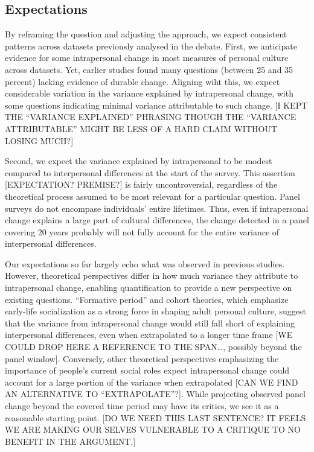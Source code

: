\documentclass[
  11pt,
]{article}
\begin{document}
\hypertarget{expectations}{%
\subsection{Expectations}\label{expectations}}

By reframing the question and adjusting the approach, we expect
consistent patterns across datasets previously analysed in the debate.
First, we anticipate evidence for some intrapersonal change in most
measures of personal culture across datasets. Yet, earlier studies found
many questions (between 25 and 35 percent) lacking evidence of durable
change. Aligning wiht this, we expect considerable variation in the
variance explained by intrapersonal change, with some questions
indicating minimal variance attributable to such change. {[}I KEPT THE
``VARIANCE EXPLAINED'' PHRASING THOUGH THE ``VARIANCE ATTRIBUTABLE''
MIGHT BE LESS OF A HARD CLAIM WITHOUT LOSING MUCH?{]}

Second, we expect the variance explained by intrapersonal to be modest
compared to interpersonal differences at the start of the survey. This
assertion {[}EXPECTATION? PREMISE?{]} is fairly uncontroversial,
regardless of the theoretical process assumed to be most relevant for a
particular question. Panel surveys do not encompase individuals' entire
lifetimes. Thus, even if intrapersonal change explains a large part of
cultural differences, the change detected in a panel covering 20 years
probably will not fully account for the entire variance of interpersonal
differences.

Our expectations so far largely echo what was observed in previous
studies. However, theoretical perspectives differ in how much variance
they attribute to intrapersonal change, enabling quantification to
provide a new perspective on existing questions. ``Formative period''
and cohort theories, which emphasize early-life socialization as a
strong force in shaping adult personal culture, suggest that the
variance from intrapersonal change would still fall short of explaining
interpersonal differences, even when extrapolated to a longer time frame
{[}WE COULD DROP HERE A REFERENCE TO THE SPAN\ldots, possibly beyond the
panel window{]}. Conversely, other theoretical perspectives emphasizing
the importance of people's current social roles expect intrapersonal
change could account for a large portion of the variance when
extrapolated {[}CAN WE FIND AN ALTERNATIVE TO ``EXTRAPOLATE''?{]}. While
projecting observed panel change beyond the covered time period may have
its critics, we see it as a reasonable starting point. {[}DO WE NEED
THIS LAST SENTENCE? IT FEELS WE ARE MAKING OUR SELVES VULNERABLE TO A
CRITIQUE TO NO BENEFIT IN THE ARGUMENT.{]}
\end{document}
